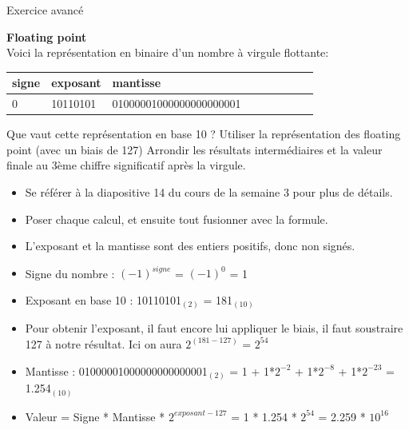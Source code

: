 Exercice avancé 
\begin{Exercice}[10 minutes] \textbf{Floating point}\\
    
    Voici la représentation en binaire d'un nombre à virgule flottante: \\
    
     \begin{tabular}{| p{1cm} | p{3cm} | p{9.5cm} | p{1cm} | p{1cm} | p{1cm} | p{1cm} | p{1cm} | p{1cm} |} 
            \hline
            signe & exposant & mantisse \\ [0.5ex] 
            \hline
            0 & 10110101 & 01000001000000000000001 \\ [0.5ex]
            \hline
	\end{tabular}
	
    Que vaut cette représentation en base 10 ? Utiliser la représentation des floating point (avec un biais de 127) Arrondir les résultats intermédiaires et la valeur finale au 3ème chiffre significatif après la virgule. \\
	
    \begin{conseil}
    
    \begin{itemize}
    	\item Se référer à la diapositive 14 du cours de la semaine 3 pour plus de détails.
    	\item Poser chaque calcul, et ensuite tout fusionner avec la formule.
    	\item L'exposant et la mantisse sont des entiers positifs, donc non signés.
    \end{itemize}
    
    \end{conseil}
    
    \begin{solution}
        \begin{itemize}
        	\item Signe du nombre : $(-1)^{signe}$ = $(-1)^0$ = 1
        	\item Exposant en base 10 : 10110101$_{(2)}$ = 181$_{(10)}$
        	\item Pour obtenir l'exposant, il faut encore lui appliquer le biais, il faut soustraire 127 à notre résultat. Ici on aura $2^{(181-127)}$ = $2^{54}$
        	\item Mantisse : 01000001000000000000001$_{(2)}$ = 1 + 1*$2^{-2}$ + 1*$2^{-8}$ + 1*$2^{-23}$ = 1.254$_{(10)}$
        	\item Valeur = Signe * Mantisse * $2^{exposant-127}$ = 1 * 1.254 * $2^{54}$ = 2.259 * $10^{16}$
        \end{itemize}
    \end{solution}
\end{Exercice}
\newpage

